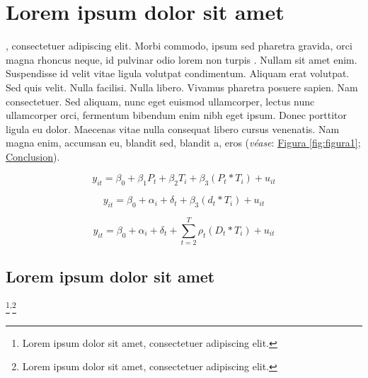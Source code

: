 \chapter{Lorem ipsum dolor sit amet}
    \label{chap:capitulo2}

, consectetuer adipiscing elit. Morbi commodo, ipsum sed pharetra gravida, orci magna rhoncus neque, id pulvinar odio lorem non turpis \citep[Chap.~5]{angrist2015}. Nullam sit amet enim. Suspendisse id velit vitae ligula volutpat condimentum. Aliquam erat volutpat. Sed quis velit. Nulla facilisi. Nulla libero. Vivamus pharetra posuere sapien. Nam consectetuer. Sed aliquam, nunc eget euismod ullamcorper, lectus nunc ullamcorper orci, fermentum bibendum enim nibh eget ipsum. Donec porttitor ligula eu dolor. Maecenas vitae nulla consequat libero cursus venenatis. Nam magna enim, accumsan eu, blandit sed, blandit a, eros (\emph{véase}: \hyperref[fig:figura1]{Figura \ref{fig:figura1}}; \hyperref[chap:conclusion]{Conclusion}).

\begin{equation}
y_{it} = \beta_0 + \beta_1 P_t + \beta_2 T_i + \beta_3 (P_t * T_i) + u_{it}
\end{equation}

\begin{equation}
y_{it} = \beta_0 + \alpha_i + \delta_t + \beta_3 (d_t * T_i) + u_{it}
\end{equation}

\begin{equation}
y_{it} = \beta_0 + \alpha_i + \delta_t + \sum_{t=2}^{T} \rho_t (D_t * T_i) + u_{it}
\end{equation}


\section{Lorem ipsum dolor sit amet}

\lipsum[2]\footnote{Lorem ipsum dolor sit amet, consectetuer adipiscing elit.}\textsuperscript{,}\footnote{Lorem ipsum dolor sit amet, consectetuer adipiscing elit.}

